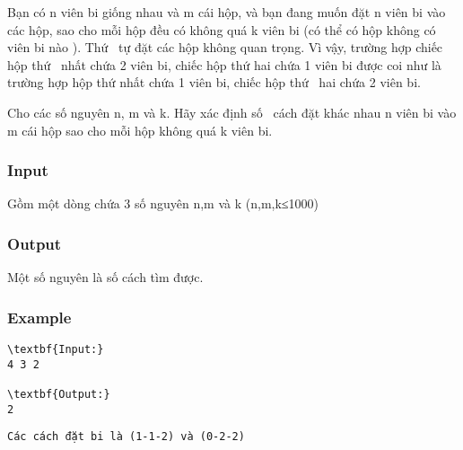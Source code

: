 



   Bạn có n viên bi giống nhau và m cái hộp, và bạn đang muốn đặt n viên bi vào các hộp, sao cho mỗi hộp đều có không quá k viên bi (có thể có hộp không có viên bi nào ). Thứ  tự đặt các hộp không quan trọng. Vì vậy, trường hợp chiếc hộp thứ  nhất chứa 2 viên bi, chiếc hộp thứ hai chứa 1 viên bi được coi như là trường hợp hộp thứ nhất chứa 1 viên bi, chiếc hộp thứ  hai chứa 2 viên bi.  

   Cho các số nguyên n, m và k. Hãy xác định số  cách đặt khác nhau n viên bi vào m cái hộp sao cho mỗi hộp không quá k viên bi.  

\subsubsection{   Input  }

   Gồm một dòng chứa 3 số nguyên n,m và k (n,m,k≤1000)  

\subsubsection{   Output  }

   Một số nguyên là số cách tìm được.  

\subsubsection{   Example  }
\begin{verbatim}
\textbf{Input:}
4 3 2

\textbf{Output:}
2\end{verbatim}
\begin{verbatim}
Các cách đặt bi là (1-1-2) và (0-2-2)\end{verbatim}